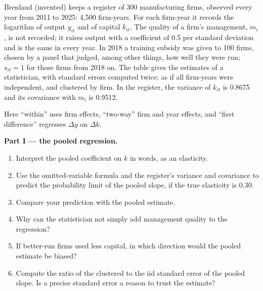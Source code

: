 \begin{problem}\label{pb:b3:panel-data:firms}
Brenland (invented) keeps a register of 300 manufacturing firms, observed every
year from 2011 to 2025: 4{,}500 firm-years. For each firm-year it records the
logarithm of output $y_{it}$ and of capital $k_{it}$. The quality of a firm's
management, $m_i$, is not recorded; it raises output with a coefficient of 0.5
per standard deviation and is the same in every year. In 2018 a training
subsidy was given to 100 firms, chosen by a panel that judged, among other
things, how well they were run; $s_{it} = 1$ for those firms from 2018 on. The
table gives the estimates of a statistician, with standard errors computed
twice: as if all firm-years were independent, and clustered by firm. In the
register, the variance of $k_{it}$ is 0.8675 and its covariance with $m_i$ is
0.9512. %
\begin{center}
\end{center}
Here ``within'' uses firm effects, ``two-way'' firm and year effects, and
``first difference'' regresses $\Delta y$ on $\Delta k$.

\medskip\noindent\textbf{Part I --- the pooled regression.}
\begin{enumerate}
\item Interpret the pooled coefficient on $k$ in words, as an elasticity.
\item Use the omitted-variable formula and the register's variance and
covariance to predict the probability limit of the pooled slope, if the true
elasticity is 0.30.
\item Compare your prediction with the pooled estimate.
\item Why can the statistician not simply add management quality to the
regression?
\item If better-run firms used less capital, in which direction would the
pooled estimate be biased?
\item Compute the ratio of the clustered to the iid standard error of the pooled
slope. Is a precise standard error a reason to trust the estimate?
\end{enumerate}


\end{problem}
